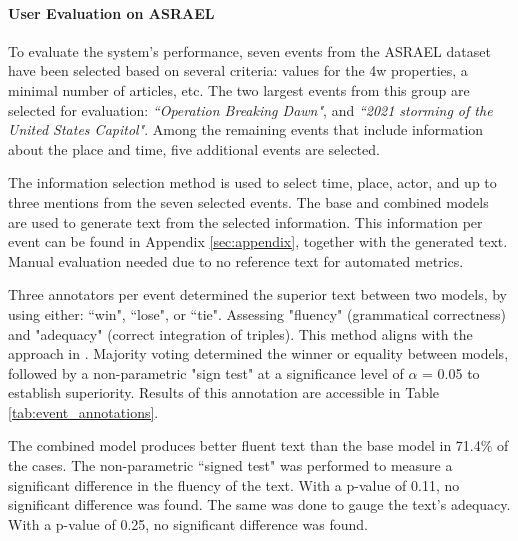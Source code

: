 \documentclass[
hf, %
]{ceurart}
\begin{document}
\paragraph*{User Evaluation on ASRAEL}
\label{sec:result_gen_text_nodes}
To evaluate the system's performance, seven events from the ASRAEL dataset have been selected based on several criteria: values for the 4w properties, a minimal number of articles, etc. The two largest events from this group are selected for evaluation: \textit{``Operation Breaking Dawn"}, and \textit{``2021 storming of the United States Capitol"}. Among the remaining events that include information about the place and time, five additional events are selected.

The information selection method is used to select time, place, actor, and up to three mentions from the seven selected events. The base and combined models are used to generate text from the selected information. This information per event can be found in Appendix \ref{sec:appendix}, together with the generated text. Manual evaluation needed due to no reference text for automated metrics.

Three annotators per event determined the superior text between two models, by using either: ``win", ``lose", or ``tie". Assessing "fluency" (grammatical correctness) and "adequacy" (correct integration of triples). This method aligns with the approach in \cite{JointGT}. Majority voting determined the winner or equality between models, followed by a non-parametric "sign test" at a significance level of $\alpha$ = 0.05 to establish superiority. Results of this annotation are accessible in Table \ref{tab:event_annotations}.

The combined model produces better fluent text than the base model in 71.4\% of the cases. The non-parametric ``signed test" was performed to measure a significant difference in the fluency of the text. With a p-value of 0.11, no significant difference was found. The same was done to gauge the text's adequacy. With a p-value of 0.25, no significant difference was found.
\end{document}
